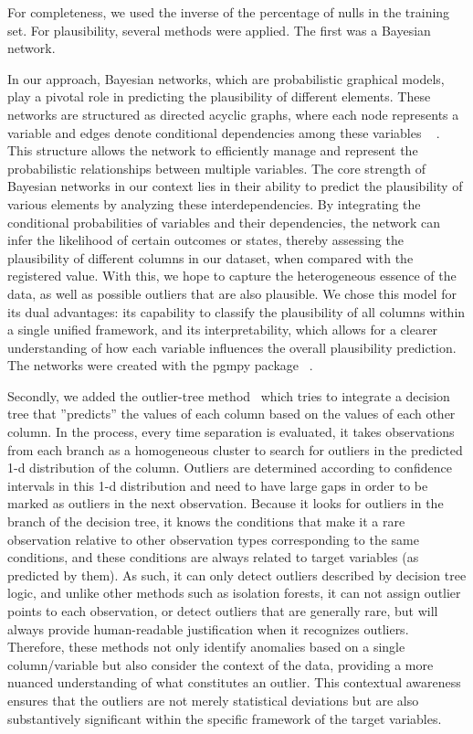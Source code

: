 For completeness, we used the inverse of the percentage of nulls in the training set. For plausibility, several methods were applied. The first was a Bayesian network. 

In our approach, Bayesian networks, which are probabilistic graphical models, play a pivotal role in predicting the plausibility of different elements. These networks are structured as directed acyclic graphs, where each node represents a variable and edges denote conditional dependencies among these variables \unskip~\cite{pearl1988probabilistic} . This structure allows the network to efficiently manage and represent the probabilistic relationships between multiple variables. The core strength of Bayesian networks in our context lies in their ability to predict the plausibility of various elements by analyzing these interdependencies. By integrating the conditional probabilities of variables and their dependencies, the network can infer the likelihood of certain outcomes or states, thereby assessing the plausibility of different columns in our dataset, when compared with the registered value. With this, we hope to capture the heterogeneous essence of the data, as well as possible outliers that are also plausible. We chose this model for its dual advantages: its capability to classify the plausibility of all columns within a single unified framework, and its interpretability, which allows for a clearer understanding of how each variable influences the overall plausibility prediction. The networks were created with the pgmpy package \unskip~\cite{pgmpy}. 

Secondly, we added the outlier-tree method\unskip~\cite{cortesExplainableOutlierDetection2020} which tries to integrate a decision tree that ''predicts'' the values of each column based on the values of each other column. In the process, every time separation is evaluated, it takes observations from each branch as a homogeneous cluster to search for outliers in the predicted 1-d distribution of the column. Outliers are determined according to confidence intervals in this 1-d distribution and need to have large gaps in order to be marked as outliers in the next observation. Because it looks for outliers in the branch of the decision tree, it knows the conditions that make it a rare observation relative to other observation types corresponding to the same conditions, and these conditions are always related to target variables (as predicted by them).  As such, it can only detect outliers described by decision tree logic, and unlike other methods such as isolation forests, it can not assign outlier points to each observation, or detect outliers that are generally rare, but will always provide human-readable justification when it recognizes outliers. Therefore, these methods not only identify anomalies based on a single column/variable but also consider the context of the data, providing a more nuanced understanding of what constitutes an outlier. This contextual awareness ensures that the outliers are not merely statistical deviations but are also substantively significant within the specific framework of the target variables. 


